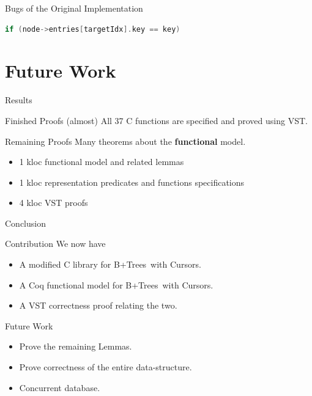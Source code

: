 \documentclass[page number,usenames,dvipsnames]{beamer}
\def\btrees{B+Trees}
\begin{document}
\begin{frame}[fragile]{Bugs of the Original Implementation}
  \begin{lstlisting}[language=C]
if (node->entries[targetIdx].key == key)
  \end{lstlisting}
  \vfill
  \bugcursor
\end{frame}

\section{Future Work}
\begin{frame}{Results}

  \begin{exampleblock}{Finished Proofs}
    {\color{Gray}(almost)} All 37 C functions are specified and proved using VST.
  \end{exampleblock}
  \vfill
  \begin{alertblock}{Remaining Proofs}
    Many theorems about the \textbf{functional} model.
  \end{alertblock}
  \vfill
  \begin{itemize}
  \item 1 kloc functional model and related lemmas
  \item 1 kloc representation predicates and functions specifications
  \item 4 kloc VST proofs
  \end{itemize}
  
\end{frame}

\begin{frame}{Conclusion}
  \begin{block}{Contribution}
    We now have
    \begin{itemize}
    \item A modified C library for \btrees\ with Cursors.
    \item A Coq functional model for \btrees\ with Cursors.
    \item A VST correctness proof relating the two.
    \end{itemize}
  \end{block}
  \vfill
  \begin{block}{Future Work}
    \begin{itemize}
    \item Prove the remaining Lemmas.
    \item Prove correctness of the entire data-structure.
    \item Concurrent database.
    \end{itemize}
  \end{block}
  
\end{frame}
\end{document}
